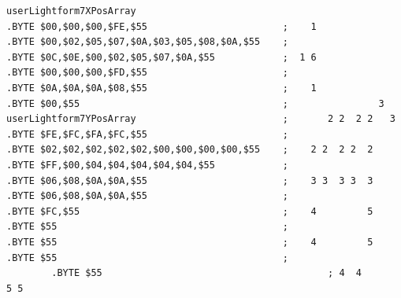 \begin{minipage}[b]{0.68\linewidth}
\begin{lrbox}{\mybox}%
\begin{lstlisting}[basicstyle=\ttfamily\tiny,escapechar=\%]
userLightform7XPosArray
.BYTE $00,$00,$00,$FE,$55                        ;    1              
.BYTE $00,$02,$05,$07,$0A,$03,$05,$08,$0A,$55    ;                   
.BYTE $0C,$0E,$00,$02,$05,$07,$0A,$55            ;  1 6              
.BYTE $00,$00,$00,$FD,$55                        ;                   
.BYTE $0A,$0A,$0A,$08,$55                        ;    1              
.BYTE $00,$55                                    ;                3  
userLightform7YPosArray                          ;       2 2  2 2   3
.BYTE $FE,$FC,$FA,$FC,$55                        ;                   
.BYTE $02,$02,$02,$02,$02,$00,$00,$00,$00,$55    ;    2 2  2 2  2    
.BYTE $FF,$00,$04,$04,$04,$04,$04,$55            ;                   
.BYTE $06,$08,$0A,$0A,$55                        ;    3 3  3 3  3    
.BYTE $06,$08,$0A,$0A,$55                        ;                   
.BYTE $FC,$55                                    ;    4         5    
.BYTE $55                                        ;                   
.BYTE $55                                        ;    4         5    
.BYTE $55                                        ;                   
        .BYTE $55                                        ; 4  4       5 5    
\end{lstlisting}
\end{lrbox}%
\scalebox{0.8}{\usebox{\mybox}}

\end{minipage}
%
%
